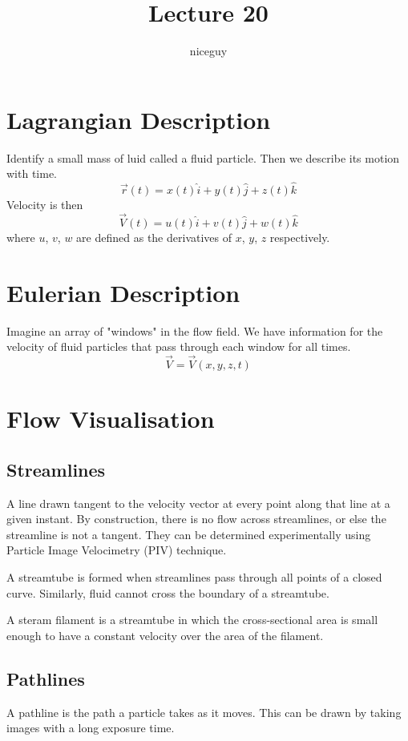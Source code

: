 \documentclass[12pt]{article}
\author{niceguy}
\title{Lecture 20}
\begin{document}
\maketitle

\section{Lagrangian Description}
Identify a small mass of luid called a fluid particle. Then we describe its motion with time.
$$\vec{r}(t) = x(t)\hat{i} + y(t)\hat{j} + z(t)\hat{k}$$
Velocity is then
$$\vec{V}(t) = u(t)\hat{i} + v(t)\hat{j} + w(t)\hat{k}$$
where $u$, $v$, $w$ are defined as the derivatives of $x$, $y$, $z$ respectively.

\section{Eulerian Description}
Imagine an array of "windows" in the flow field. We have information for the velocity of fluid particles that pass through each window for all times.
$$\vec{V} = \vec{V}(x,y,z,t)$$

\section{Flow Visualisation}

\subsection{Streamlines}
A line drawn tangent to the velocity vector at every point along that line at a given instant. By construction, there is no flow across streamlines, or else the streamline is not a tangent. They can be determined experimentally using Particle Image Velocimetry (PIV) technique.
\begin{defn}
	A streamtube is formed when streamlines pass through all points of a closed curve. Similarly, fluid cannot cross the boundary of a streamtube.
\end{defn}
\begin{defn}
	A steram filament is a streamtube in which the cross-sectional area is small enough to have a constant velocity over the area of the filament.
\end{defn}

\subsection{Pathlines}
A pathline is the path a particle takes as it moves. This can be drawn by taking images with a long exposure time.
\end{document}
